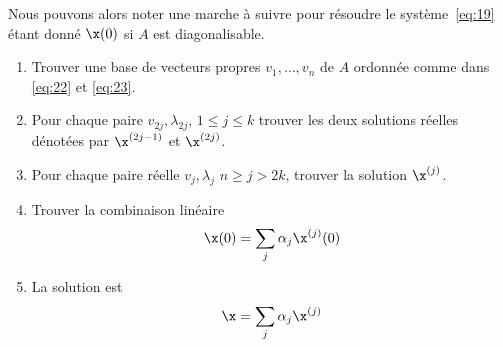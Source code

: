 {Nous pouvons alors noter une marche à suivre pour résoudre le système~\eqref{eq:19} étant donné $\x(0)$ si $A$ est diagonalisable.
\begin{enumerate}
\item Trouver une base de vecteurs propres $v_1,\dots,v_n$ de $A$ ordonnée comme dans \eqref{eq:22} et \eqref{eq:23}. 
\item Pour chaque paire $v_{2j},\lambda_{2j}$, $1 \leq j \leq k$ trouver les  deux solutions réelles dénotées par  $\x^{(2j-1)}$ et $\x^{(2j)}$. 
\item Pour chaque paire réelle $v_j, \lambda_j$ $n\geq j>2k$, trouver la solution $\x^{(j)}$. 
\item Trouver la combinaison linéaire 
  \begin{displaymath}
    \x(0) = \sum_{j} \alpha_j \x^{(j)}(0)
  \end{displaymath}
\item La solution est 
  \begin{displaymath}
    \x = \sum_{j} \alpha_j \x^{(j)} 
  \end{displaymath}
\end{enumerate}



}
